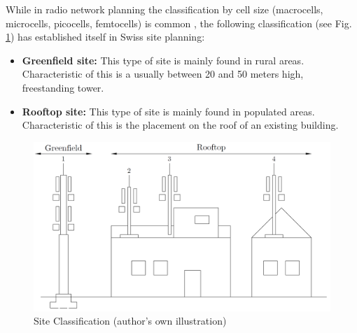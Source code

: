 \begin{English}
    While in radio network planning the classification by cell size (macrocells, microcells, picocells, femtocells) is common \cite{jiangCellularCommunicationNetworks2024}, the following classification (see Fig. \ref{fig:site_classification}) has established itself in Swiss site planning:

    \begin{itemize}
        \item \textbf{Greenfield site:} This type of site is mainly found in rural areas. Characteristic of this is a usually between 20 and 50 meters high, freestanding tower.
        \item \textbf{Rooftop site:} This type of site is mainly found in populated areas. Characteristic of this is the placement on the roof of an existing building.
    \end{itemize}
\end{English}

\begin{figure}[h]
    \centering
    \includegraphics[width=1\textwidth]{dwg/site_classification.PNG}
    \caption{Site Classification (author's own illustration)}
    \label{fig:site_classification}
\end{figure}

